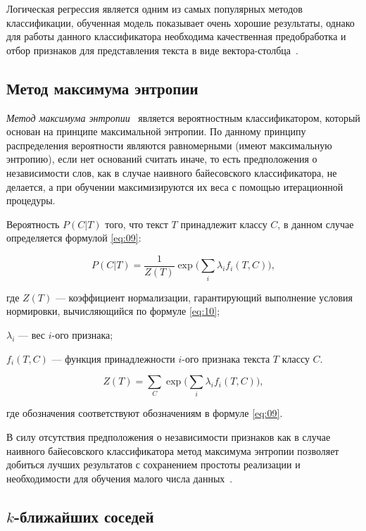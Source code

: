 Логическая регрессия является одним из самых популярных методов классификации,
обученная модель показывает очень хорошие результаты, однако для работы
данного классификатора необходима качественная предобработка и отбор
признаков для представления текста в виде вектора-столбца~\cite{article05}.

\subsection{Метод максимума энтропии}

\textit{Метод максимума энтропии}~\cite{article23} является вероятностным
классификатором, который основан на принципе максимальной энтропии. По данному
принципу распределения вероятности являются равномерными (имеют максимальную
энтропию), если нет оснований считать иначе, то есть предположения о
независимости слов, как в случае наивного байесовского классификатора, не
делается, а при обучении максимизируются их веса с помощью итерационной
процедуры.

Вероятность $P(C|T)$ того, что текст $T$ принадлежит классу $C$, в данном случае
определяется формулой \ref{eq:09}:

\begin{equation}\label{eq:09}
    P(C|T) = \frac{1}{Z(T)}\exp\Big(\sum_i \lambda_i f_i(T, C)\Big),
\end{equation}

где $Z(T)$ --- коэффициент нормализации, гарантирующий выполнение условия
нормировки, вычисляющийся по формуле \ref{eq:10};

$\lambda_i$ --- вес $i$-ого признака;

$f_i(T, C)$ --- функция принадлежности $i$-ого признака текста $T$ классу
$C$.

\begin{equation}\label{eq:10}
    Z(T) = \sum_C\exp\Big(\sum_i \lambda_i f_i(T, C)\Big),
\end{equation}

где обозначения соответствуют обозначениям в формуле \ref{eq:09}.

В силу отсутствия предположения о независимости признаков как в
случае наивного байесовского классификатора метод максимума энтропии
позволяет добиться лучших результатов с сохранением простоты реализации и
необходимости для обучения малого числа данных~\cite{article05}.

\subsection{$k$-ближайших соседей}

